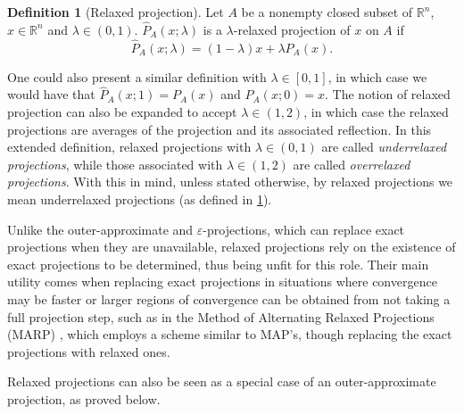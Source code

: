 \documentclass[smallextended,numbook,nospthms]{svjour3}
\theoremstyle{plain}
\theoremstyle{definition}
\newtheorem{definition}[theorem]{Definition}
\def\RR{\mathds R}
\begin{document}
\begin{definition}[Relaxed projection]\label{def:relax proj}
	Let $A$ be a nonempty closed subset of $\RR^n$, $x \in \RR^n$ and $\lambda \in (0,1)$. $\hat{P}_{A}(x; \lambda)$ is a $\lambda$-relaxed projection of $x$ on $A$ if 
	$$
	\hat{P}_{A}(x; \lambda)=(1-\lambda)x+\lambda P_{A}(x).
	$$
\end{definition}
One could also present a similar definition with $\lambda \in [0,1]$, in which case we would have that $\hat{P}_{A}(x;1)=P_{A}(x)$ and $\hat{P}_{A}(x;0)=x$.
The notion of relaxed projection can also be expanded to accept $\lambda \in (1,2)$, in which case the relaxed projections are averages of the projection and its associated reflection. In this extended definition, relaxed projections with $\lambda \in (0,1)$ are called \emph{underrelaxed projections}, while those associated with $\lambda \in (1,2)$ are called \emph{overrelaxed projections}. With this in mind, unless stated otherwise, by relaxed projections we mean underrelaxed projections (as defined in \cref{def:relax proj}).

Unlike the outer-approximate and $\varepsilon$-projections, which can replace exact projections when they are unavailable, relaxed projections rely on the existence of exact projections to be determined, thus being unfit for this role. Their main utility comes when replacing exact projections in situations where convergence may be faster or larger regions of convergence can be obtained from not taking a full projection step, such as in the Method of Alternating Relaxed Projections (MARP) \cite{Bauschke:2013}, which employs a scheme similar to MAP's, though replacing the exact projections with relaxed ones.

Relaxed projections can also be seen as a special case of an outer-approximate projection, as proved below.
\end{document}
